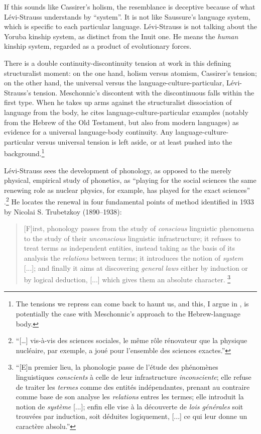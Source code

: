 \documentclass[output=paper]{langscibook}
\begin{document}
If this sounds like Cassirer's holism, the resemblance is deceptive because of what Lévi-Strauss understands by ``system''. It is not like Saussure's language system, which is specific to each particular language. Lévi-Strauss is not talking about the Yoruba kinship system, as distinct from the Inuit one. He means the \emph{human} kinship system, regarded as a product of evolutionary forces.

There is a double continuity-discontinuity tension at work in this defining structuralist moment: on the one hand, holism versus atomism, Cassirer's tension; on the other hand, the universal versus the language-culture-particular, Lévi-Strauss's tension. Meschonnic's discontent with the discontinuous falls within the first type. When he takes up arms against the structuralist dissociation of language from the body, he cites language-culture-particular examples (notably from the Hebrew of the Old Testament, but also from modern languages) as evidence for a universal language-body continuity. Any language-culture-particular versus universal tension is left aside, or at least pushed into the background.\footnote{The tensions we repress can come back to haunt us, and this, I argue in \citet{Joseph2018languagebody}, is potentially the case with Meschonnic's approach to the Hebrew-language body.} 

Lévi-Strauss sees the development of phonology, as opposed to the merely physical, empirical study of phonetics, as ``playing for the social sciences the same renewing role as nuclear physics, for example, has played for the exact sciences'' \citep[35]{LeviStrauss1945}.\footnote{``[…] vis-à-vis des sciences sociales, le même rôle rénovateur que la physique nucléaire, par exemple, a joué pour l’ensemble des sciences exactes.''} He locates the renewal in four fundamental points of method identified in 1933 by Nicolai S. Trubetzkoy (1890--1938):

\begin{quotation}
[F]irst, phonology passes from the study of \emph{conscious} linguistic phenomena to the study of their \emph{unconscious} linguistic infrastructure; it refuses to treat terms as independent entities, instead taking as the basis of its analysis the \emph{relations} between terms; it introduces the notion of \emph{system} [...]; and finally it aims at discovering \emph{general laws} either by induction or by logical deduction, [...] which gives them an absolute character. \citep[35]{LeviStrauss1945}\footnote{``[E]n premier lieu, la phonologie passe de l’étude des phénomènes linguistiques \emph{conscients} à celle de leur infrastructure \emph{inconsciente}; elle refuse de traiter les \emph{termes} comme des entités indépendantes, prenant au contraire comme base de son analyse les \emph{relations} entres les termes; elle introduit la notion de \emph{système} [...]; enfin elle vise à la découverte de \emph{lois générales} soit trouvées par induction, soit déduites logiquement, [...] ce qui leur donne un caractère absolu.''}
\end{quotation}
\end{document}
